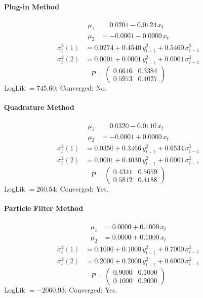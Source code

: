 \documentclass[11pt, a4paper]{article}
\begin{document}
\paragraph{Plug-in Method}
\begin{align}
\mu_{1} &= 0.0201 -0.0124\, x_t \\
\mu_{2} &= -0.0001 -0.0000\, x_t
\end{align}
\begin{align}
\sigma^2_{t}(1) &= 0.0274 + 0.4540\, y_{t-1}^2 + 0.5460\, \sigma^2_{t-1} \\
\sigma^2_{t}(2) &= 0.0001 + 0.0001\, y_{t-1}^2 + 0.0001\, \sigma^2_{t-1}
\end{align}
\begin{equation}
P = \begin{pmatrix} 0.6616 & 0.3384 \\ 0.5973 & 0.4027 \end{pmatrix}
\end{equation}
LogLik $= 745.60$; Converged: No.

\paragraph{Quadrature Method}
\begin{align}
\mu_{1} &= 0.0320 -0.0110\, x_t \\
\mu_{2} &= -0.0001 + 0.0000\, x_t
\end{align}
\begin{align}
\sigma^2_{t}(1) &= 0.0350 + 0.3466\, y_{t-1}^2 + 0.6534\, \sigma^2_{t-1} \\
\sigma^2_{t}(2) &= 0.0001 + 0.4030\, y_{t-1}^2 + 0.0001\, \sigma^2_{t-1}
\end{align}
\begin{equation}
P = \begin{pmatrix} 0.4341 & 0.5659 \\ 0.5812 & 0.4188 \end{pmatrix}
\end{equation}
LogLik $= 260.54$; Converged: Yes.

\paragraph{Particle Filter Method}
\begin{align}
\mu_{1} &= 0.0000 + 0.1000\, x_t \\
\mu_{2} &= 0.0000 + 0.1000\, x_t
\end{align}
\begin{align}
\sigma^2_{t}(1) &= 0.1000 + 0.1000\, y_{t-1}^2 + 0.7000\, \sigma^2_{t-1} \\
\sigma^2_{t}(2) &= 0.2000 + 0.2000\, y_{t-1}^2 + 0.6000\, \sigma^2_{t-1}
\end{align}
\begin{equation}
P = \begin{pmatrix} 0.9000 & 0.1000 \\ 0.1000 & 0.9000 \end{pmatrix}
\end{equation}
LogLik $= -2060.93$; Converged: Yes.
\end{document}
